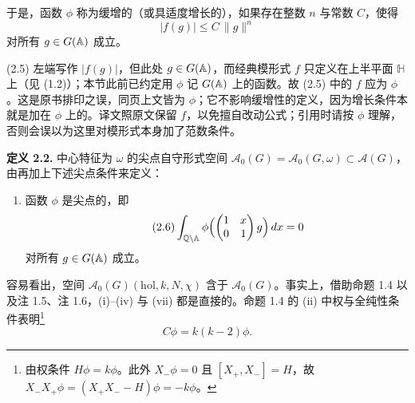 于是，函数 $\phi$ 称为缓增的（或具适度增长的），如果存在整数 $n$ 与常数 $C$，使得
\begin{equation*}\tag{2.5}
|f(g)|\le C\,\|g\|^n
\end{equation*}
对所有 $g\in G(\mathbb{A})$ 成立。

\begin{annote}
(2.5) 左端写作 $|f(g)|$，但此处 $g\in G(\mathbb{A})$，而经典模形式 $f$ 只定义在上半平面 $\mathbb{H}$ 上（见 (1.2)）；本节此前已约定用 $\phi$ 记 $G(\mathbb{A})$ 上的函数。故 (2.5) 中的 $f$ 应为 $\phi$。这是原书排印之误，同页上文皆为 $\phi$；它不影响缓增性的定义，因为增长条件本就是加在 $\phi$ 上的。译文照原文保留 $f$，以免擅自改动公式；引用时请按 $\phi$ 理解，否则会误以为这里对模形式本身加了范数条件。

\par\vspace{0.15em}{\raggedleft 【来源：原书第 139--140 页；Bump 上书第 2 章关于缓增性的定义（A）】\par}
\end{annote}

\medskip\noindent\textbf{定义 2.2.}\quad
中心特征为 $\omega$ 的尖点自守形式空间 $\mathcal{A}_0(G)=\mathcal{A}_0(G,\omega)\subset\mathcal{A}(G)$，由再加上下述尖点条件来定义：
\begin{enumerate}[label=(\roman*),leftmargin=2.4em,itemsep=0.15em,topsep=0.25em,start=7]
\item 函数 $\phi$ 是尖点的，即
\begin{equation*}\tag{2.6}
\int_{\mathbb{Q}\backslash\mathbb{A}}\phi\Bigl(\begin{pmatrix}1&x\\0&1\end{pmatrix}g\Bigr)\,dx=0
\end{equation*}
对所有 $g\in G(\mathbb{A})$ 成立。
\end{enumerate}

\medskip
容易看出，空间 $\mathcal{A}_0(G)(\mathrm{hol},k,N,\chi)$ 含于 $\mathcal{A}_0(G)$。事实上，借助命题 1.4 以及注 1.5、注 1.6，(i)–(iv) 与 (vii) 都是直接的。命题 1.4 的 (ii) 中权与全纯性条件表明\footnote{由权条件 $H\phi=k\phi$。此外 $X_-\phi=0$ 且 $[X_+,X_-]=H$，故 $X_-X_+\phi=(X_+X_--H)\phi=-k\phi$。}
\begin{equation*}\tag{2.7}
C\phi=k(k-2)\phi.
\end{equation*}

